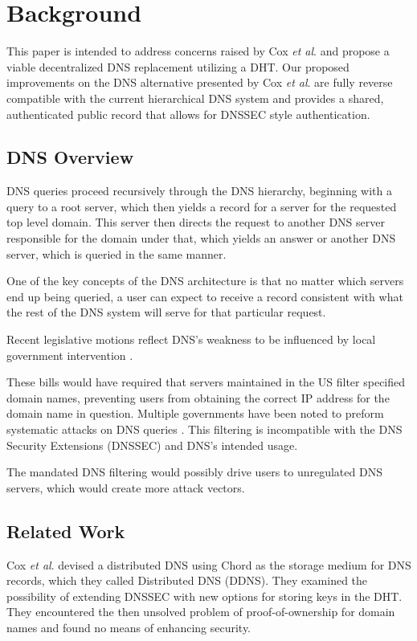 \section{Background}

This paper is intended to address concerns raised by Cox \textit{et al}. \cite{cox2002serving} and propose a viable decentralized DNS replacement utilizing a DHT. Our proposed improvements on the DNS alternative presented by Cox \textit{et al}. are fully reverse compatible with the current hierarchical DNS system and provides a shared, authenticated public record that allows for DNSSEC style authentication.

\subsection{DNS Overview}

DNS queries proceed recursively through the DNS hierarchy, beginning with a query to a root server, which then yields a record for a server for the requested top level domain.  This server then directs the request to another DNS server responsible for the domain under that, which yields an answer or another DNS server, which is queried in the same manner.

One of the key concepts of the DNS architecture is that no matter which servers end up being queried, a user can expect to receive a record consistent with what the rest of the DNS system will serve for that particular request.

Recent legislative motions reflect DNS's weakness to be influenced by local government intervention \cite{sopa} \cite{lemley2011don} \cite{crocker2011security}.

These bills would have required that servers maintained in the US filter specified domain names, preventing users from obtaining the correct IP address for the domain name in question. Multiple governments have been noted to preform systematic attacks on DNS queries \cite{inject}. This filtering is incompatible with the DNS Security Extensions (DNSSEC) \cite{crocker2011security} and DNS's intended usage. 

The mandated DNS filtering would possibly drive users to unregulated DNS servers, which would create more attack vectors.


\subsection{Related Work}
Cox \textit{et al}. devised a distributed DNS using Chord \cite{chord} as the storage medium for DNS records, which they called Distributed DNS (DDNS). They examined the possibility of extending DNSSEC with new options for storing keys in the DHT. They encountered the then unsolved problem of proof-of-ownership \cite{bitcoin} for domain names and found no means of enhancing security. 

